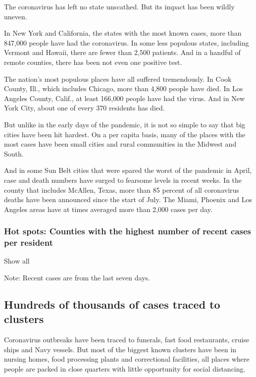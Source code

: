 The coronavirus has left no state unscathed. But its impact has been
wildly uneven.

In New York and California, the states with the most known cases, more
than 847,000 people have had the coronavirus. In some less populous
states, including Vermont and Hawaii, there are fewer than 2,500
patients. And in a handful of remote counties, there has been not even
one positive test.

The nation's most populous places have all suffered tremendously. In
Cook County, Ill., which includes Chicago, more than 4,800 people have
died. In Los Angeles County, Calif., at least 166,000 people have had
the virus. And in New York City, about one of every 370 residents has
died.

But unlike in the early days of the pandemic, it is not so simple to say
that big cities have been hit hardest. On a per capita basis, many of
the places with the most cases have been small cities and rural
communities in the Midwest and South.

And in some Sun Belt cities that were spared the worst of the pandemic
in April, case and death numbers have surged to fearsome levels in
recent weeks. In the county that includes McAllen, Texas, more than 85
percent of all coronavirus deaths have been announced since the start of
July. The Miami, Phoenix and Los Angeles areas have at times averaged
more than 2,000 cases per day.

\hypertarget{hot-spots-counties-with-the-highest-number-of-recent-cases-per-resident}{%
\subsubsection{Hot spots: Counties with the highest number of recent
cases per
resident}\label{hot-spots-counties-with-the-highest-number-of-recent-cases-per-resident}}

Show all

Note: Recent cases are from the last seven days.

\hypertarget{hundreds-of-thousands-of-cases-traced-to-clusters}{%
\subsection{Hundreds of thousands of cases traced to
clusters}\label{hundreds-of-thousands-of-cases-traced-to-clusters}}

Coronavirus outbreaks have been traced to funerals, fast food
restaurants, cruise ships and Navy vessels. But most of the biggest
known clusters have been in nursing homes, food processing plants and
correctional facilities, all places where people are packed in close
quarters with little opportunity for social distancing.

